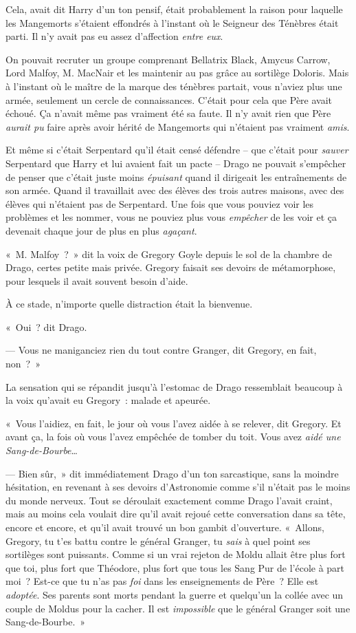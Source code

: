 Cela, avait dit Harry d'un ton pensif, était probablement la raison pour laquelle les Mangemorts s'étaient effondrés à l'instant où le Seigneur des Ténèbres était parti. Il n'y avait pas eu assez d'affection \emph{entre eux}.

On pouvait recruter un groupe comprenant Bellatrix Black, Amycus Carrow, Lord Malfoy, M. MacNair et les maintenir au pas grâce au sortilège Doloris. Mais à l'instant où le maître de la marque des ténèbres partait, vous n'aviez plus une armée, seulement un cercle de connaissances. C'était pour cela que Père avait échoué. Ça n'avait même pas vraiment été sa faute. Il n'y avait rien que Père \emph{aurait pu} faire après avoir hérité de Mangemorts qui n'étaient pas vraiment \emph{amis}.

Et même si c'était Serpentard qu'il était censé défendre -- que c'était pour \emph{sauver} Serpentard que Harry et lui avaient fait un pacte -- Drago ne pouvait s'empêcher de penser que c'était juste moins \emph{épuisant} quand il dirigeait les entraînements de son armée. Quand il travaillait avec des élèves des trois autres maisons, avec des élèves qui n'étaient pas de Serpentard. Une fois que vous pouviez voir les problèmes et les nommer, vous ne pouviez plus vous \emph{empêcher} de les voir et ça devenait chaque jour de plus en plus \emph{agaçant}.

«~M. Malfoy~?~» dit la voix de Gregory Goyle depuis le sol de la chambre de Drago, certes petite mais privée. Gregory faisait ses devoirs de métamorphose, pour lesquels il avait souvent besoin d'aide.

À ce stade, n'importe quelle distraction était la bienvenue.

«~Oui~? dit Drago.

--- Vous ne maniganciez rien du tout contre Granger, dit Gregory, en fait, non~?~»

La sensation qui se répandit jusqu'à l'estomac de Drago ressemblait beaucoup à la voix qu'avait eu Gregory~: malade et apeurée.

«~Vous l'aidiez, en fait, le jour où vous l'avez aidée à se relever, dit Gregory. Et avant ça, la fois où vous l'avez empêchée de tomber du toit. Vous avez \emph{aidé une Sang-de-Bourbe}…

--- Bien sûr,~» dit immédiatement Drago d'un ton sarcastique, sans la moindre hésitation, en revenant à ses devoirs d'Astronomie comme s'il n'était pas le moins du monde nerveux. Tout se déroulait exactement comme Drago l'avait craint, mais au moins cela voulait dire qu'il avait rejoué cette conversation dans sa tête, encore et encore, et qu'il avait trouvé un bon gambit d'ouverture. «~Allons, Gregory, tu t'es battu contre le général Granger, tu \emph{sais} à quel point ses sortilèges sont puissants. Comme si un vrai rejeton de Moldu allait être plus fort que toi, plus fort que Théodore, plus fort que tous les Sang Pur de l'école à part moi~? Est-ce que tu n'as pas \emph{foi} dans les enseignements de Père~? Elle est \emph{adoptée}. Ses parents sont morts pendant la guerre et quelqu'un la collée avec un couple de Moldus pour la cacher. Il est \emph{impossible} que le général Granger soit une Sang-de-Bourbe.~»

